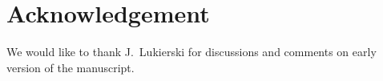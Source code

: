 \documentclass [prd,twocolumn,nofootinbib,showpacs]  {revtex4}
\begin{document}
\section*{Acknowledgement}

We would like to thank J.~Lukierski for discussions and comments on early version of the manuscript.



























\end{document}
